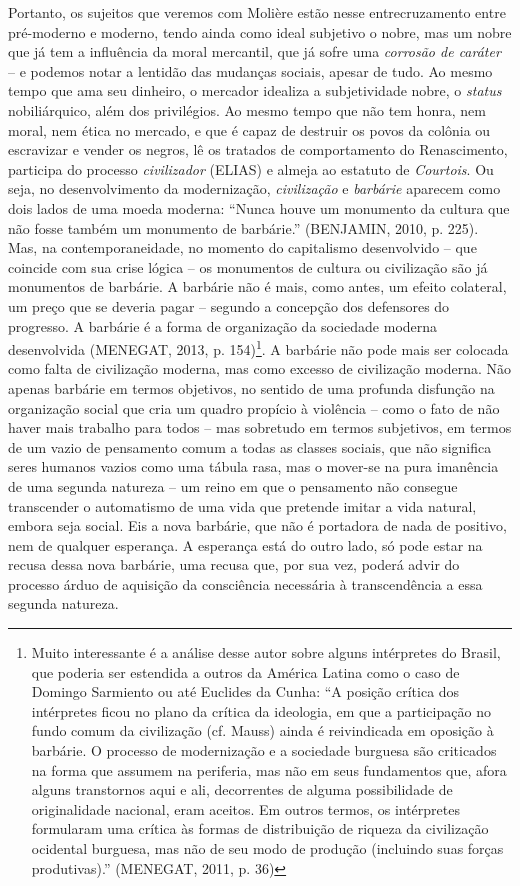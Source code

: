 Portanto, os sujeitos que veremos com Molière estão nesse
entrecruzamento entre pré-moderno e moderno, tendo ainda como ideal
subjetivo o nobre, mas um nobre que já tem a influência da moral
mercantil, que já sofre uma \emph{corrosão de caráter} -- e podemos
notar a lentidão das mudanças sociais, apesar de tudo. Ao mesmo tempo
que ama seu dinheiro, o mercador idealiza a subjetividade nobre, o
\emph{status} nobiliárquico, além dos privilégios. Ao mesmo tempo que
não tem honra, nem moral, nem ética no mercado, e que é capaz de
destruir os povos da colônia ou escravizar e vender os negros, lê os
tratados de comportamento do Renascimento, participa do processo
\emph{civilizador} (ELIAS) e almeja ao estatuto de \emph{Courtois}. Ou
seja, no desenvolvimento da modernização, \emph{civilização} e
\emph{barbárie} aparecem como dois lados de uma moeda moderna: ``Nunca
houve um monumento da cultura que não fosse também um monumento de
barbárie.'' (BENJAMIN, 2010, p. 225). Mas, na contemporaneidade, no
momento do capitalismo desenvolvido -- que coincide com sua crise lógica
-- os monumentos de cultura ou civilização são já monumentos de
barbárie. A barbárie não é mais, como antes, um efeito colateral, um
preço que se deveria pagar -- segundo a concepção dos defensores do
progresso. A barbárie é a forma de organização da sociedade moderna
desenvolvida (MENEGAT, 2013, p. 154)\footnote{Muito interessante é a
  análise desse autor sobre alguns intérpretes do Brasil, que poderia
  ser estendida a outros da América Latina como o caso de Domingo
  Sarmiento ou até Euclides da Cunha: ``A posição crítica dos
  intérpretes ficou no plano da crítica da ideologia, em que a
  participação no fundo comum da civilização (cf. Mauss) ainda é
  reivindicada em oposição à barbárie. O processo de modernização e a
  sociedade burguesa são criticados na forma que assumem na periferia,
  mas não em seus fundamentos que, afora alguns transtornos aqui e ali,
  decorrentes de alguma possibilidade de originalidade nacional, eram
  aceitos. Em outros termos, os intérpretes formularam uma crítica às
  formas de distribuição de riqueza da civilização ocidental burguesa,
  mas não de seu modo de produção (incluindo suas forças produtivas).''
  (MENEGAT, 2011, p. 36)}. A barbárie não pode mais ser colocada como
falta de civilização moderna, mas como excesso de civilização moderna.
Não apenas barbárie em termos objetivos, no sentido de uma profunda
disfunção na organização social que cria um quadro propício à violência
-- como o fato de não haver mais trabalho para todos -- mas sobretudo em
termos subjetivos, em termos de um vazio de pensamento comum a todas as
classes sociais, que não significa seres humanos vazios como uma tábula
rasa, mas o mover-se na pura imanência de uma segunda natureza -- um
reino em que o pensamento não consegue transcender o automatismo de uma
vida que pretende imitar a vida natural, embora seja social. Eis a nova
barbárie, que não é portadora de nada de positivo, nem de qualquer
esperança. A esperança está do outro lado, só pode estar na recusa dessa
nova barbárie, uma recusa que, por sua vez, poderá advir do processo
árduo de aquisição da consciência necessária à transcendência a essa
segunda natureza.

